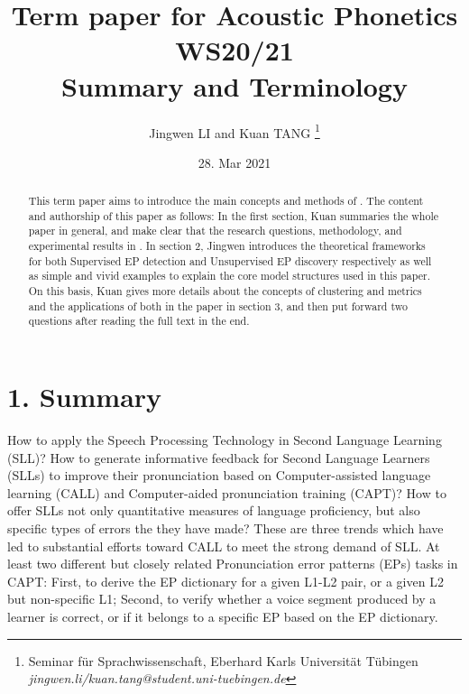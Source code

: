 \documentclass[nobib]{tufte-handout}
\title{{Term paper for Acoustic Phonetics WS20/21\\\cite{wang2015supervised} Summary and Terminology}}
\author{Jingwen LI and Kuan TANG
\thanks{
Seminar f\"ur Sprachwissenschaft, Eberhard Karls Universit\"at T\"ubingen \\
{\it{jingwen.li/kuan.tang@student.uni-tuebingen.de}}}}
\date{28. Mar 2021}
\begin{document}
\maketitle

\begin{abstract}
\noindent This term paper aims to introduce the main concepts and methods of \cite{wang2015supervised}. The content and authorship of this paper as follows: In the first section, Kuan summaries the whole paper in general, and make clear that the research questions, methodology, and experimental results in \cite{wang2015supervised}. In section 2, Jingwen introduces the theoretical frameworks for both Supervised EP detection and Unsupervised EP discovery respectively as well as simple and vivid examples to explain the core model structures used in this paper. On this basis, Kuan gives more details about the concepts of clustering and metrics and the applications of both in the paper in section 3, and then put forward two questions after reading the full text in the end.
\end{abstract}


\bigskip
\section{1. \textbf{Summary}}

How to apply the Speech Processing Technology in Second Language Learning (SLL)? How to generate informative feedback for Second Language Learners (SLLs) to improve their pronunciation based on Computer-assisted language learning (CALL)  and Computer-aided pronunciation training (CAPT)? How to offer SLLs not only quantitative measures of language proficiency, but also specific types of errors the they have made? These are three trends which have led to substantial efforts toward CALL to meet the strong demand of SLL. At least two different but closely related Pronunciation error patterns (EPs) tasks in CAPT: First, to derive the EP dictionary for a given L1-L2 pair, or a given L2 but non-specific L1; Second, to verify whether a voice segment produced by a learner is correct, or if it belongs to a specific EP based on the EP dictionary. 
\end{document}
